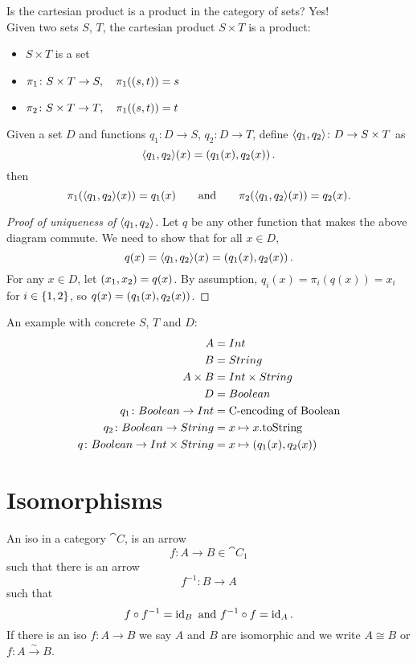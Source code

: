 \documentclass{scrartcl}
\begin{document}
\begin{example}
  Is the cartesian product is a product in the category of sets? Yes!\\
  Given two sets $S$, $T$, the cartesian product $S \times T$ is a
  product:
  \begin{itemize}
  \item $S \times T$ is a set
  \item $\pi_1 \colon S \times T \to S, \quad \pi_1(\tuple{s, t}) = s$
  \item $\pi_2 \colon S \times T \to T, \quad \pi_1(\tuple{s, t}) = t$
  \end{itemize}
  Given a set $D$ and functions $q_1 \colon D \to S$, $q_2 \colon D
  \to T$, define $\pair{q_1}{q_2} \colon D \to S \times T$ as
  \[
  \langle q_1, q_2 \rangle(x) = \left( q_1(x), q_2(x) \right).
  \]
  then
  \[
  \pi_1(\langle q_1, q_2 \rangle(x)) = q_1(x) \qquad \text{and} \qquad
  \pi_2(\langle q_1, q_2 \rangle(x)) = q_2(x).
  \]
  \begin{proof}[Proof of uniqueness of $\langle q_1, q_2 \rangle$]
    Let $q$ be any other function that makes the above diagram
    commute.  We need to show that for all $x \in D$,
    \[
    q(x) = \langle q_1, q_2 \rangle(x) = \left( q_1(x), q_2(x) \right).
    \]
    For any $x \in D$, let $\left( x_1, x_2 \right) = q(x)$.  By assumption,
    $q_i(x) = \pi_i(q(x)) = x_i$ for $i \in \left\{ 1, 2 \right\}$, so $q(x) =
    \left( q_1(x), q_2(x) \right)$.
  \end{proof}
  An example with concrete $S$, $T$ and $D$:
  \begin{align*}
    A &= Int\\
    B &= String\\
    A \times B &= Int \times String\\
    D &= Boolean\\
    q_1 \colon Boolean \to Int &= \text{C-encoding of Boolean}\\
    q_2 \colon Boolean \to String &= x \mapsto x.\text{toString}\\
    q \colon Boolean \to Int \times String &= x \mapsto \tuple{q_1(x),
      q_2(x)}
  \end{align*}
\end{example}

\section{Isomorphisms}
\begin{definition}[Isomorphism]
  An iso in a category $\cat{C}$, is an arrow
  \[ f\colon A \to B \in \cat{C}_1 \]
  such that there is an arrow
  \[ f^{-1} \colon B \to A \]
  such that
  \[ f \circ f^{-1} = \operatorname{id}_B \text{ and } f^{-1} \circ f = \operatorname{id}_A. \]
  If there is an iso $f \colon A \to B$ we say $A$ and $B$ are isomorphic and
  we write $A \cong B$ or $f \colon A \stackrel{\sim}{\to} B$.
\end{definition}
\end{document}
